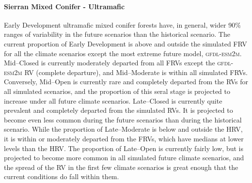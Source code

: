\paragraph*{Sierran Mixed Conifer - Ultramafic} Early Development ultramafic mixed conifer forests have, in general, wider 90\% ranges of variability in the future scenarios than the historical scenario. The current proportion of Early Development is above and outside the simulated FRV for all the climate scenarios except the most extreme future model, \textsc{gfdl-esm2m}. Mid--Closed is currently moderately departed from all FRVs except the \textsc{gfdl-esm2m} RV (complete departure), and Mid--Moderate is within all simulated FRVs. Conversely, Mid--Open is currently rare and completely departed from the RVs for all simulated scenarios, and the proportion of this seral stage is projected to increase under all future climate scenarios. Late--Closed is currently quite prevalent and completely departed from the simulated RVs. It is projected to become even less common during the future scenarios than during the historical scenario. While the proportion of Late--Moderate is below and outside the HRV, it is within or moderately departed from the FRVs, which have medians at lower levels than the HRV. The proportion of Late--Open is currently fairly low, but is projected to become more common in all simulated future climate scenarios, and the spread of the RV in the first few climate scenarios is great enough that the current conditions do fall within them. 


